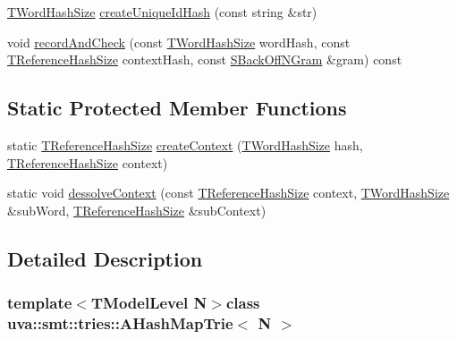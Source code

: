 \begin{DoxyCompactItemize}
\item 
\hyperlink{namespaceuva_1_1smt_1_1hashing_acdc1f2765e669283f8e9c1ed42705314}{T\+Word\+Hash\+Size} \hyperlink{classuva_1_1smt_1_1tries_1_1_a_hash_map_trie_ad23c5ad2dea14220aa3a61edcbd5346a}{create\+Unique\+Id\+Hash} (const string \&str)
\item 
void \hyperlink{classuva_1_1smt_1_1tries_1_1_a_hash_map_trie_af3f7c7d7f0c8dddd5fc2ea5318e58109}{record\+And\+Check} (const \hyperlink{namespaceuva_1_1smt_1_1hashing_acdc1f2765e669283f8e9c1ed42705314}{T\+Word\+Hash\+Size} word\+Hash, const \hyperlink{namespaceuva_1_1smt_1_1hashing_a6cc10b288b11b76c718a898b022fbdd1}{T\+Reference\+Hash\+Size} context\+Hash, const \hyperlink{structuva_1_1smt_1_1tries_1_1_s_back_off_n_gram}{S\+Back\+Off\+N\+Gram} \&gram) const 
\end{DoxyCompactItemize}
\subsection*{Static Protected Member Functions}
\begin{DoxyCompactItemize}
\item 
static \hyperlink{namespaceuva_1_1smt_1_1hashing_a6cc10b288b11b76c718a898b022fbdd1}{T\+Reference\+Hash\+Size} \hyperlink{classuva_1_1smt_1_1tries_1_1_a_hash_map_trie_af4aac18ab4f9db12bae8ba0ee8f63d92}{create\+Context} (\hyperlink{namespaceuva_1_1smt_1_1hashing_acdc1f2765e669283f8e9c1ed42705314}{T\+Word\+Hash\+Size} hash, \hyperlink{namespaceuva_1_1smt_1_1hashing_a6cc10b288b11b76c718a898b022fbdd1}{T\+Reference\+Hash\+Size} context)
\item 
static void \hyperlink{classuva_1_1smt_1_1tries_1_1_a_hash_map_trie_a9a35a764c83eafb369f7b858fa9b826e}{dessolve\+Context} (const \hyperlink{namespaceuva_1_1smt_1_1hashing_a6cc10b288b11b76c718a898b022fbdd1}{T\+Reference\+Hash\+Size} context, \hyperlink{namespaceuva_1_1smt_1_1hashing_acdc1f2765e669283f8e9c1ed42705314}{T\+Word\+Hash\+Size} \&sub\+Word, \hyperlink{namespaceuva_1_1smt_1_1hashing_a6cc10b288b11b76c718a898b022fbdd1}{T\+Reference\+Hash\+Size} \&sub\+Context)
\end{DoxyCompactItemize}


\subsection{Detailed Description}
\subsubsection*{template$<$T\+Model\+Level N$>$class uva\+::smt\+::tries\+::\+A\+Hash\+Map\+Trie$<$ N $>$}

